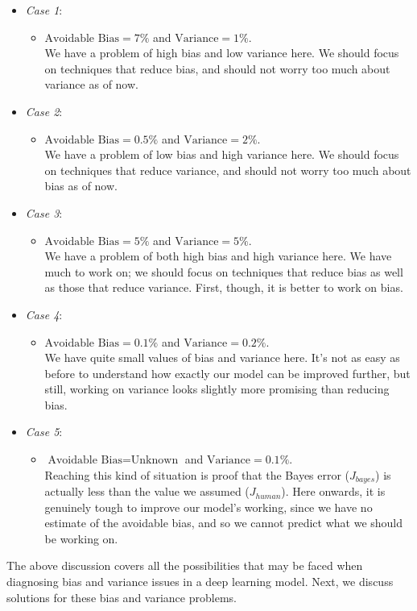 \documentclass[a4paper, 12pt]{report}
\begin{document}
\begin{itemize}
\item[] \textit{Case 1}:
\begin{itemize}
\item[] $\text{Avoidable Bias} = 7\%$ and $\text{Variance} = 1\%$.\\We have a problem of high bias and low variance here. We should focus on techniques that reduce bias, and should not worry too much about variance as of now.
\end{itemize}
\item[] \textit{Case 2}:
\begin{itemize}
\item[] $\text{Avoidable Bias} = 0.5\%$ and $\text{Variance} = 2\%$.\\We have a problem of low bias and high variance here. We should focus on techniques that reduce variance, and should not worry too much about bias as of now.
\end{itemize}
\item[] \textit{Case 3}:
\begin{itemize}
\item[] $\text{Avoidable Bias} = 5\%$ and $\text{Variance} = 5\%$.\\We have a problem of both high bias and high variance here. We have much to work on; we should focus on techniques that reduce bias as well as those that reduce variance. First, though, it is better to work on bias.
\end{itemize}
\item[] \textit{Case 4}:
\begin{itemize}
\item[] $\text{Avoidable Bias} = 0.1\%$ and $\text{Variance} = 0.2\%$.\\We have quite small values of bias and variance here. It's not as easy as before to understand how exactly our model can be improved further, but still, working on variance looks slightly more promising than reducing bias.
\end{itemize}
\item[] \textit{Case 5}:
\begin{itemize}
\item[] $\text{Avoidable Bias} = \text{Unknown}$ and $\text{Variance} = 0.1\%$.\\Reaching this kind of situation is proof that the Bayes error ($J_{bayes}$) is actually less than the value we assumed ($J_{human}$). Here onwards, it is genuinely tough to improve our model's working, since we have no estimate of the avoidable bias, and so we cannot predict what we should be working on.
\end{itemize}
\end{itemize}
The above discussion covers all the possibilities that may be faced when diagnosing bias and variance issues in a deep learning model. Next, we discuss solutions for these bias and variance problems.
\end{document}
